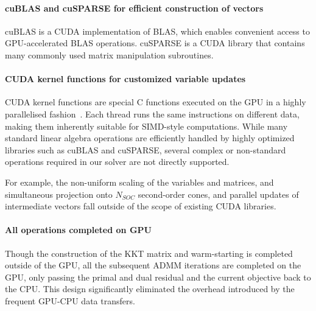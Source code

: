 \paragraph{cuBLAS and cuSPARSE for efficient construction of vectors}

cuBLAS is a CUDA implementation of BLAS, which enables convenient access to GPU-accelerated BLAS operations. cuSPARSE is a CUDA library that contains many commonly used matrix manipulation subroutines. 

\paragraph{CUDA kernel functions for customized variable updates}

CUDA kernel functions are special C functions executed on the GPU in a highly parallelised fashion~\cite{GPU_ADMM}. Each thread runs the same instructions on different data, making them inherently suitable for SIMD-style computations. While many standard linear algebra operations are efficiently handled by highly optimized libraries such as cuBLAS and cuSPARSE, several complex or non-standard operations required in our solver are not directly supported. 

For example, the non-uniform scaling of the variables and matrices, and simultaneous projection onto $N_{SOC}$ second-order cones, and parallel updates of intermediate vectors fall outside of the scope of existing CUDA libraries. 

\paragraph{All operations completed on GPU}

Though the construction of the KKT matrix and warm-starting is completed outside of the GPU, all the subsequent ADMM iterations are completed on the GPU, only passing the primal and dual residual and the current objective back to the CPU. This design significantly eliminated the overhead introduced by the frequent GPU-CPU data transfers.

